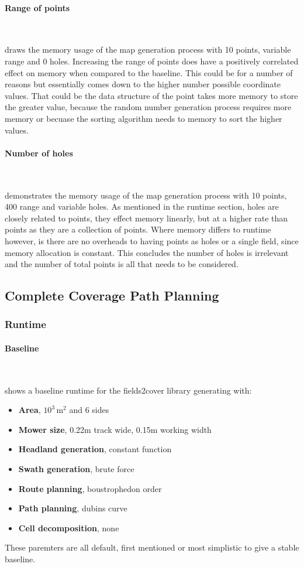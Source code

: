 \documentclass[final]{cmpreport_02}
\begin{document}
\paragraph{Range of points} \

 draws the memory usage of the map generation process with 10 points, variable range and 0 holes.
Increasing the range of points does have a positively correlated effect on memory when compared to the baseline.
This could be for a number of reasons but essentially comes down to the higher number possible coordinate values.
That could be the data structure of the point takes more memory to store the greater value, because the random number generation process requires more memory or becuase the sorting algorithm needs to memory to sort the higher values.

\paragraph{Number of holes} \

 demonstrates the memory usage of the map generation process with 10 points, 400 range and variable holes.
As mentioned in the runtime section, holes are closely related to points, they effect memory linearly, but at a higher rate than points as they are a collection of points.
Where memory differs to runtime however, is there are no overheads to having points as holes or a single field, since memory allocation is constant.
This concludes the number of holes is irrelevant and the number of total points is all that needs to be considered.


\subsection{Complete Coverage Path Planning}
\subsubsection{Runtime}
\paragraph{Baseline} \

 shows a baseline runtime for the fields2cover library generating with:

\begin{itemize}
	\item{\textbf{Area}, $10^3\,\text{m}^2$ and 6 sides}
	\item{\textbf{Mower size}, 0.22m track wide, 0.15m working width}
	\item{\textbf{Headland generation}, constant function}
	\item{\textbf{Swath generation}, brute force}
	\item{\textbf{Route planning}, boustrophedon order}
	\item{\textbf{Path planning}, dubins curve}
	\item{\textbf{Cell decomposition}, none}
\end{itemize}
These paremters are all default, first mentioned or most simplistic to give a stable baseline.
\end{document}
